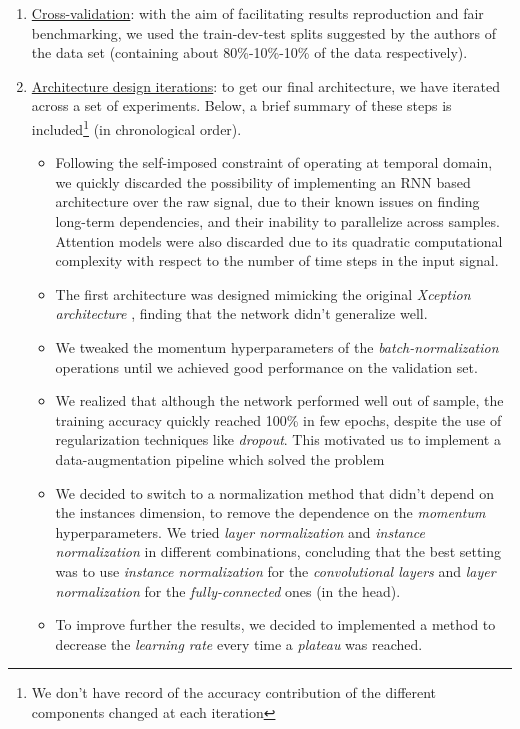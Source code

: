 \documentclass{elsarticle}
\begin{document}
\begin{enumerate}
	\item \underline{Cross-validation}: with the aim of facilitating results reproduction and fair benchmarking, we used the train-dev-test splits suggested by the authors of the data set \cite{speechcommands, Warden2018} (containing about 80\%-10\%-10\% of the data respectively).
	\item \underline{Architecture design iterations}: to get our final architecture, we have iterated across a set of experiments. Below, a brief summary of these steps is included\footnote{We don't have record of the accuracy contribution of the different components changed at each iteration}  (in chronological order).
	\begin{itemize}
	\item Following the self-imposed constraint of operating at temporal domain, we quickly discarded the possibility of implementing an RNN based architecture over the raw signal, due to their known issues on finding long-term dependencies, and their inability to parallelize across samples. Attention models were also discarded due to its quadratic computational complexity with respect to the number of time steps in the input signal. 
	\item The first architecture was designed mimicking the original \textit{Xception architecture} \cite{FChollet2017}, finding that the network didn't generalize well.
	\item We tweaked the momentum  hyperparameters of the \textit{batch-normalization} operations until we achieved good performance on the validation set.
	\item We realized that although the network performed well out of sample, the training accuracy quickly reached 100\% in few epochs, despite the use of regularization techniques like \textit{dropout}. This motivated us to implement a data-augmentation pipeline which solved the problem
	\item We decided to switch to a normalization method that didn't depend on the instances dimension, to remove the dependence on the \textit{momentum} hyperparameters. We tried \textit{layer normalization} and \textit{instance normalization} in different combinations, concluding that the best setting was to use \textit{instance normalization} for the \textit{convolutional layers} and \textit{layer normalization} for the \textit{fully-connected} ones (in the head). 
	\item To improve further the results, we decided to implemented a method to decrease the \textit{learning rate} every time a \textit{plateau} was reached.

\end{itemize}
\end{enumerate}
\end{document}
